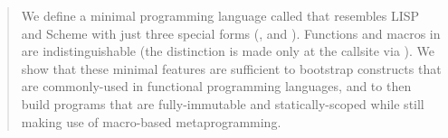 \begin{abstract}
We define a minimal programming language called \lang that resembles LISP and Scheme with
just three special forms (,  and ).
Functions and macros in \lang are indistinguishable (the distinction is made only at
the callsite via ). We show that these minimal features are sufficient
to bootstrap constructs that are commonly-used in functional programming languages,
and to then build programs that are fully-immutable and statically-scoped while still
making use of macro-based metaprogramming.
\end{abstract}
